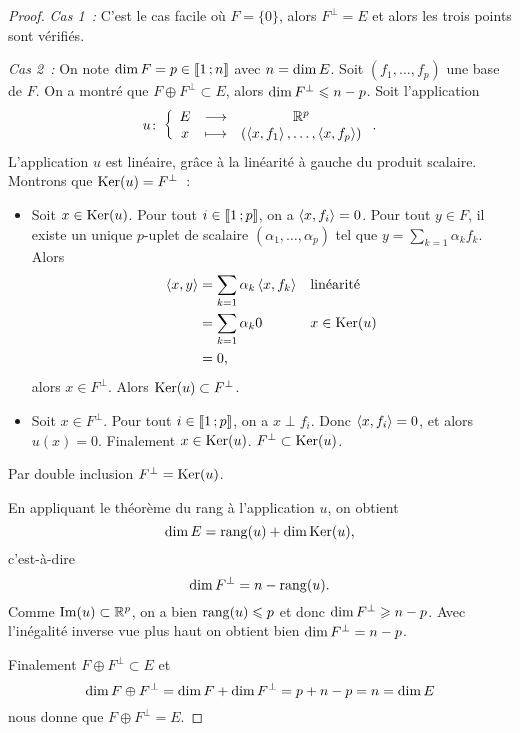 \begin{proof}
  \emph{Cas 1~:} C'est le cas facile où \(F=\{0\}\), alors \(F^\perp =E\) et alors les trois points sont vérifiés.

  \emph{Cas 2~:} On note \(\operatorname{dim} F=p \in \mathopen{\llbracket}1\mathclose{}\mathpunct{};n\mathclose{\rrbracket}\) avec \(n = \operatorname{dim} E\). Soit \((f_1, \ldots, f_p)\) une base de \(F\). On a montré que \(F \oplus F^\perp \subset E\), alors \(\operatorname{dim} F^\perp \leqslant n-p\). Soit l'application
  \begin{equation}
    u\colon \left\{\begin{array}{ccc} E & \longrightarrow &\mathbb{R}^p\\ x & \longmapsto & (\left\langle{x},{f_1}\right\rangle, \ldots, \left\langle{x},{f_p}\right\rangle) \end{array} \right..
  \end{equation}
  L'application \(u\) est linéaire, grâce à la linéarité à gauche du produit scalaire. Montrons que \(\operatorname{Ker}(u)=F^\perp\)~:
  \begin{itemize}
  \item Soit \(x \in \operatorname{Ker}(u)\). Pour tout \(i \in \mathopen{\llbracket}1\mathclose{}\mathpunct{};p\mathclose{\rrbracket}\), on a \(\left\langle{x},{f_i}\right\rangle=0\). Pour tout \(y \in F\), il existe un unique \(p\)-uplet de scalaire \((\alpha_1, \ldots, \alpha_p)\) tel que \(y = \sum_{k=1}\alpha_k f_k\). Alors
    \begin{align}
      \left\langle{x},{y}\right\rangle &= \sum_{k=1}\alpha_k \left\langle{x},{f_k}\right\rangle && \text{linéarité} \\
      &=\sum_{k=1}\alpha_k 0 && x \in \operatorname{Ker}(u) \\
      &=0,
    \end{align}
    alors \(x \in F^\perp\). Alors \(\operatorname{Ker}(u) \subset F^\perp\).
  \item Soit \(x \in F^\perp\). Pour tout \(i \in \mathopen{\llbracket}1\mathclose{}\mathpunct{};p\mathclose{\rrbracket}\), on a \(x\perp f_i\). Donc \(\left\langle{x},{f_i}\right\rangle=0\), et alors \(u(x)=0\). Finalement \(x \in \operatorname{Ker}(u)\). \(F^\perp \subset \operatorname{Ker}(u)\).
  \end{itemize}
  Par double inclusion \(F^\perp = \operatorname{Ker}(u)\).

  En appliquant le théorème du rang à l'application \(u\), on obtient
  \begin{equation}
    \operatorname{dim} E = \operatorname{rang}(u) + \operatorname{dim} \operatorname{Ker}(u),
  \end{equation}
  c'est-à-dire
  \begin{equation}
    \operatorname{dim} F^\perp = n-\operatorname{rang}(u).
  \end{equation}
  Comme \(\operatorname{Im}(u) \subset \mathbb{R}^p\), on a bien \(\operatorname{rang}(u) \leqslant p\) et donc \(\operatorname{dim} F^\perp \geqslant n-p\). Avec l'inégalité inverse vue plus haut on obtient bien \(\operatorname{dim} F^\perp = n-p\).

  Finalement \(F \oplus F^\perp \subset E\) et
  \begin{equation}
    \operatorname{dim} F \oplus F^\perp = \operatorname{dim} F + \operatorname{dim} F^\perp = p+n-p=n=\operatorname{dim} E
  \end{equation}
  nous donne que \(F \oplus F^\perp = E\).
\end{proof}

